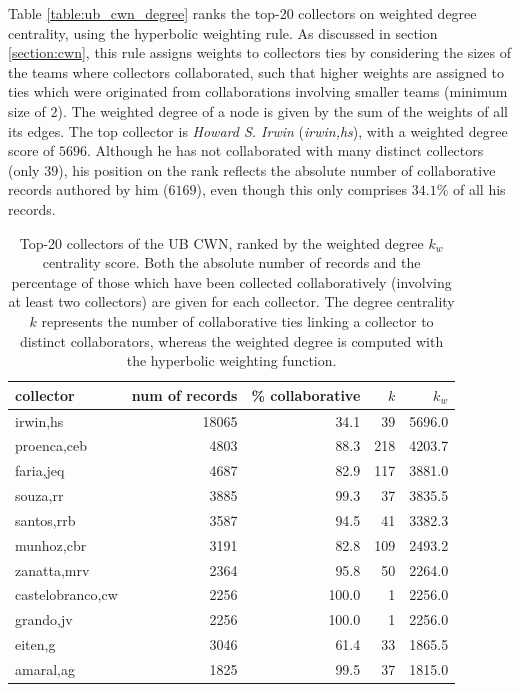 Table \ref{table:ub_cwn_degree} ranks the top-20 collectors on weighted degree centrality, using the hyperbolic weighting rule.
As discussed in section \ref{section:cwn}, this rule assigns weights to collectors ties by considering the sizes of the teams where collectors collaborated, such that higher weights are assigned to ties which were originated from collaborations involving smaller teams (minimum size of $2$).
The weighted degree of a node is given by the sum of the weights of all its edges.
The top collector is \textit{Howard S. Irwin} (\textit{irwin,hs}), with a weighted degree score of $5696$.
Although he has not collaborated with many distinct collectors (only $39$), his position on the rank reflects the absolute number of collaborative records authored by him ($6169$), even though this only comprises $34.1\%$ of all his records. 
%
\begin{table}[H]
  \caption[Top-20 collectors of the UB CWN, ranked by the weighted degree centrality score.]{Top-20 collectors of the UB CWN, ranked by the weighted degree $k_w$ centrality score. Both the absolute number of records and the percentage of those which have been collected collaboratively (involving at least two collectors) are given for each collector. The degree centrality $k$ represents the number of collaborative ties linking a collector to distinct collaborators, whereas the weighted degree is computed with the hyperbolic weighting function.}
  \begin{center}
  \begin{tabular}{l r r r r}
      collector & num of records & \% collaborative & $k$ & $k_w$ \\
      \hline
      irwin,hs & 18065 & 34.1 & 39 & 5696.0 \\
      proenca,ceb & 4803 & 88.3 & 218 & 4203.7 \\
      faria,jeq & 4687 & 82.9 & 117 & 3881.0 \\
      souza,rr & 3885 & 99.3 & 37 & 3835.5 \\
      santos,rrb & 3587 & 94.5 & 41 & 3382.3 \\
      munhoz,cbr & 3191 & 82.8 & 109 & 2493.2 \\
      zanatta,mrv & 2364 & 95.8 & 50 & 2264.0 \\
      castelobranco,cw & 2256 & 100.0 & 1 & 2256.0 \\
      grando,jv & 2256 & 100.0 & 1 & 2256.0 \\
      eiten,g & 3046 & 61.4 & 33 & 1865.5 \\
      amaral,ag & 1825 & 99.5 & 37 & 1815.0 \\

\end{tabular}
\end{center}
\end{table}
